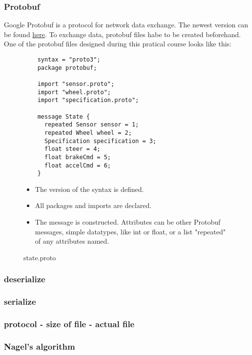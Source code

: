 \documentclass[paper=a4, fontsize=11pt]{scrartcl}
\begin{document}
  \subsubsection{Protobuf}
Google Protobuf is a protocol for network data exchange.
The newest version can be found \href{https://github.com/google/protobuf}{here}.
To exchange data, protobuf files habe to be created beforehand.
One of the protobuf files designed during this pratical course looks like this: 
  \begin{figure}[!h]
  \begin{minipage}{0.5\textwidth}
  \centering
    \begin{verbatim}
	syntax = "proto3";
	package protobuf;
	
	import "sensor.proto";
	import "wheel.proto";
	import "specification.proto";
	
	message State {
	  repeated Sensor sensor = 1;
	  repeated Wheel wheel = 2;
	  Specification specification = 3;
	  float steer = 4;
	  float brakeCmd = 5;
	  float accelCmd = 6;
	}
    \end{verbatim}
  \end{minipage}
  \begin{minipage}{0.5\textwidth}
    \begin{itemize}
\item The version of the syntax is defined.
\item All packages and imports are declared.
\item The message is constructed. Attributes can be other Protobuf messages, simple datatypes, like int or float, or a list "repeated" of any attributes named.
    \end{itemize}
  \end{minipage}
    \caption{\tiny state.proto}
  \end{figure}
  \subsubsection{deserialize}
  \subsubsection{serialize}
  \subsubsection{protocol - size of file - actual file}
  \subsubsection{Nagel's algorithm}
\end{document}
